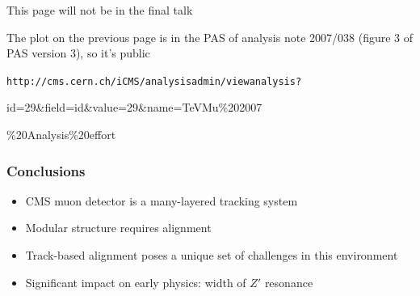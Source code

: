 \documentclass[compress]{beamer}
\begin{document}
\begin{notes}
\item This page will not be in the final talk
\item The plot on the previous page is in the PAS of analysis note 2007/038 (figure 3 of PAS version 3), so it's public
\item {\tt \small http://cms.cern.ch/iCMS/analysisadmin/viewanalysis?

id=29\&field=id\&value=29\&name=TeVMu\%202007

\%20Analysis\%20effort}
\end{notes}

\begin{frame}
\frametitle{Conclusions}
\large
\begin{itemize}\setlength{\itemsep}{0.7 cm}
\item CMS muon detector is a many-layered tracking system
\item Modular structure requires alignment
\item Track-based alignment poses a unique set of challenges in this environment
\item Significant impact on early physics: width of $Z'$ resonance
\end{itemize}
\label{numpages}
\end{frame}



\end{document}
